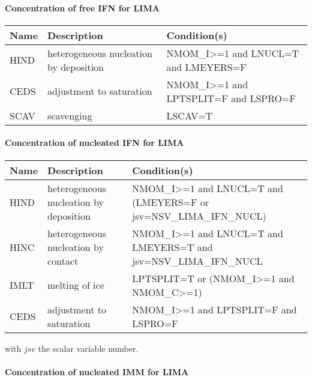 \paragraph{Concentration of free IFN for LIMA}
\mbox{} %

\begin{longtable} {|p{}|p{}|p{}|}
\hline
Name & Description & Condition(s) \\
\hline \hline
\endhead
HIND   & heterogeneous nucleation by deposition & NMOM\_I>=1 and LNUCL=T and LMEYERS=F \\\hline
CEDS   & adjustment to saturation               & NMOM\_I>=1 and LPTSPLIT=F and LSPRO=F \\\hline
SCAV   & scavenging                             & LSCAV=T \\\hline
\end{longtable}

\paragraph{Concentration of nucleated IFN for LIMA}
\mbox{} %

\begin{longtable} {|p{}|p{}|p{}|}
\hline
Name & Description & Condition(s) \\
\hline \hline
\endhead
HIND   & heterogeneous nucleation by deposition & NMOM\_I>=1 and LNUCL=T and (LMEYERS=F or jsv=NSV\_LIMA\_IFN\_NUCL) \\\hline
HINC   & heterogeneous nucleation by contact    & NMOM\_I>=1 and LNUCL=T and LMEYERS=T and jsv=NSV\_LIMA\_IFN\_NUCL \\\hline
IMLT   & melting of ice                         & LPTSPLIT=T or (NMOM\_I>=1 and NMOM\_C>=1) \\\hline
CEDS   & adjustment to saturation               & NMOM\_I>=1 and LPTSPLIT=F and LSPRO=F \\\hline
\end{longtable}

with $jsv$ the scalar variable number.

\paragraph{Concentration of nucleated IMM for LIMA}
\mbox{} %

